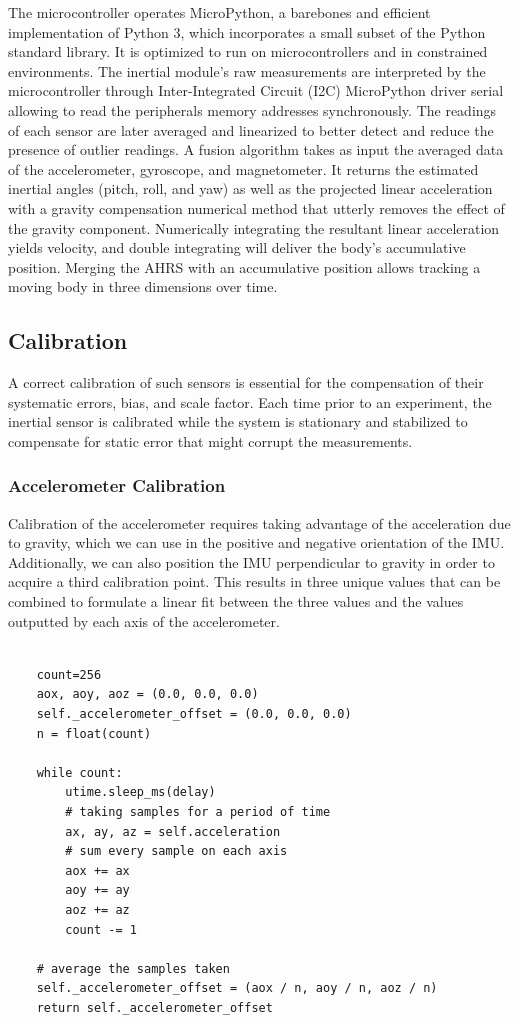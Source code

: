 The microcontroller operates MicroPython, a barebones and efficient implementation of Python 3, which incorporates a small subset of the Python standard library. It is optimized to run on microcontrollers and in constrained environments. The inertial module's raw measurements are interpreted by the microcontroller through Inter-Integrated Circuit (I2C) MicroPython driver serial allowing to read the peripherals memory addresses synchronously. The readings of each sensor are later averaged and linearized to better detect and reduce the presence of outlier readings. A fusion algorithm takes as input the averaged data of the accelerometer, gyroscope, and magnetometer. It returns the estimated inertial angles (pitch, roll, and yaw) as well as the projected linear acceleration with a gravity compensation numerical method that utterly removes the effect of the gravity component. Numerically integrating the resultant linear acceleration yields velocity, and double integrating will deliver the body's accumulative position. Merging the AHRS with an accumulative position allows tracking a moving body in three dimensions over time.

\subsection{Calibration}

A correct calibration of such sensors is essential for the compensation of their systematic errors, bias, and scale factor. Each time prior to an experiment, the inertial sensor is calibrated while the system is stationary and stabilized to compensate for static error that might corrupt the measurements.

\subsubsection{Accelerometer Calibration}

Calibration of the accelerometer requires taking advantage of the acceleration due to gravity, which we can use in the positive and negative orientation of the IMU. Additionally, we can also position the IMU perpendicular to gravity in order to acquire a third calibration point. This results in three unique values that can be combined to formulate a linear fit between the three values and the values outputted by each axis of the accelerometer.

\lstset{language=Python}
\begin{lstlisting}[frame=single]  % Start your code-block

    count=256
    aox, aoy, aoz = (0.0, 0.0, 0.0)
    self._accelerometer_offset = (0.0, 0.0, 0.0)
    n = float(count)

    while count:
        utime.sleep_ms(delay)
        # taking samples for a period of time
        ax, ay, az = self.acceleration
        # sum every sample on each axis
        aox += ax
        aoy += ay
        aoz += az 
        count -= 1

    # average the samples taken
    self._accelerometer_offset = (aox / n, aoy / n, aoz / n)
    return self._accelerometer_offset
\end{lstlisting}


